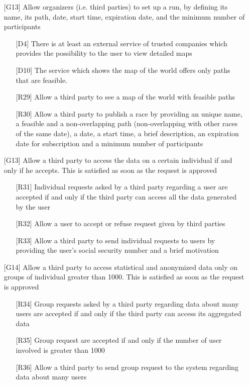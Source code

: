 \begin{itemize}
\begin{itemize}
	\end{itemize}
\item[{[G13]}] Allow organizers (i.e. third parties) to set up a run, by defining its name, its path, date, start time, expiration date, and the minimum number of participants
	\begin{itemize}
	\item[{[D4]}] There is at least an external service of trusted companies which provides the possibility to the user to view detailed maps
	\item[{[D10]}] The service which shows the map of the world offers only paths that are feasible.
	\item[{[R29]}] Allow a third party to see a map of the world with feasible paths
	\item[{[R30]}] Allow a third party to publish a race by providing an unique name, a feasible and a non-overlapping path (non-overlapping with other races of the same date), a date, a start time, a brief description, an expiration date for subscription and a minimum number of participants
	\end{itemize}
\item[{[G13]}] Allow a third party to access the data on a certain individual if and only if he accepts. This is satisfied as soon as the request is approved
	\begin{itemize}
	\item[{[R31]}] Individual requests asked by a third party regarding a user are accepted if and only if the third party can access all the data generated by the user
	\item[{[R32]}] Allow a user to accept or refuse request given by third parties
	\item[{[R33]}] Allow a third party to send individual requests to users by providing the user's social security number and a brief motivation
	\end{itemize}
\item[{[G14]}] Allow a third party to access statistical and anonymized data only on groups of individual greater than 1000. This is satisfied as soon as the request is approved
	\begin{itemize}
	\item[{[R34]}] Group requests asked by a third party regarding data about many users are accepted if and only if the third party can access its aggregated data
	\item[{[R35]}] Group request are accepted if and only if the number of user involved is greater than 1000
	\item[{[R36]}] Allow a third party to send group request to the system regarding data about many users

\end{itemize}
\end{itemize}
